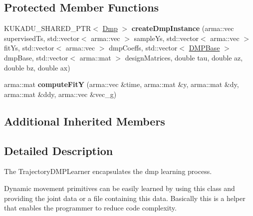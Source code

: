 \subsection*{Protected Member Functions}
\begin{DoxyCompactItemize}
\item 
\hypertarget{classkukadu_1_1CartesianDMPLearner_a5e4311236c5bafb415d5c2a410050aee}{K\-U\-K\-A\-D\-U\-\_\-\-S\-H\-A\-R\-E\-D\-\_\-\-P\-T\-R$<$ \hyperlink{classkukadu_1_1Dmp}{Dmp} $>$ {\bfseries create\-Dmp\-Instance} (arma\-::vec supervised\-Ts, std\-::vector$<$ arma\-::vec $>$ sample\-Ys, std\-::vector$<$ arma\-::vec $>$ fit\-Ys, std\-::vector$<$ arma\-::vec $>$ dmp\-Coeffs, std\-::vector$<$ \hyperlink{classkukadu_1_1DMPBase}{D\-M\-P\-Base} $>$ dmp\-Base, std\-::vector$<$ arma\-::mat $>$ design\-Matrices, double tau, double az, double bz, double ax)}\label{classkukadu_1_1CartesianDMPLearner_a5e4311236c5bafb415d5c2a410050aee}

\item 
\hypertarget{classkukadu_1_1CartesianDMPLearner_a17b09095c1a7e462e34bf5448cb021ab}{arma\-::mat {\bfseries compute\-Fit\-Y} (arma\-::vec \&time, arma\-::mat \&y, arma\-::mat \&dy, arma\-::mat \&ddy, arma\-::vec \&vec\-\_\-g)}\label{classkukadu_1_1CartesianDMPLearner_a17b09095c1a7e462e34bf5448cb021ab}

\end{DoxyCompactItemize}
\subsection*{Additional Inherited Members}


\subsection{Detailed Description}
The Trajectory\-D\-M\-P\-Learner encapsulates the dmp learning process. 

Dynamic movement primitives can be easily learned by using this class and providing the joint data or a file containing this data. Basically this is a helper that enables the programmer to reduce code complexity. 

